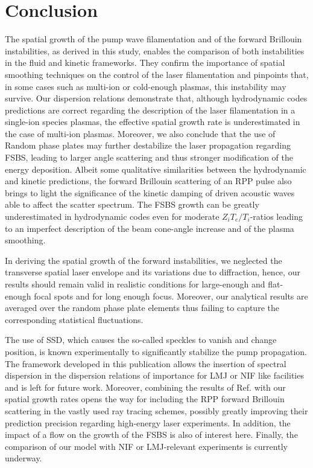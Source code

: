 \documentclass[
 reprint,
 amsmath,amssymb,
 aps,
]{revtex4-1}
\begin{document}
\section{Conclusion}
The spatial growth of the  pump wave filamentation and of the forward Brillouin instabilities, as derived in this study, enables the comparison of both instabilities in the fluid and kinetic frameworks. They confirm the importance  of spatial smoothing techniques on the control of the laser filamentation and pinpoints that, in some cases such as multi-ion  or cold-enough  plasmas, this instability may survive.
Our dispersion relations demonstrate that, although hydrodynamic codes  predictions are correct regarding the description of the laser filamentation in a single-ion species plasmas,
the effective spatial growth rate is underestimated in the case of multi-ion plasmas. 
Moreover, we also conclude that the use of Random phase plates may further destabilize the laser propagation   regarding FSBS,  leading to larger angle scattering and thus stronger modification of the energy deposition.
Albeit some qualitative similarities between the hydrodynamic and kinetic predictions, the forward Brillouin scattering of an RPP pulse also brings to light the significance of the kinetic damping of  driven acoustic  waves able to  affect  the    scatter spectrum. 
The FSBS growth can be  greatly underestimated in hydrodynamic codes  even for moderate $Z_iT_e/T_i$-ratios leading to an imperfect description of the beam cone-angle increase and of  the plasma smoothing. 

In deriving the spatial growth of the forward instabilities, we neglected the transverse spatial laser envelope and its variations due to diffraction, hence, our results should remain valid in realistic conditions for large-enough and flat-enough focal spots and for long enough focus. Moreover,  our analytical results are averaged over the random phase plate elements thus failing to capture the corresponding  statistical fluctuations. 

The use of SSD, which  causes the so-called speckles to vanish and change position, is known  experimentally to significantly stabilize the pump propagation. The framework developed in this publication  allows the insertion of spectral dispersion in the dispersion relations of importance for LMJ or NIF like facilities  and is left for future work. Moreover, 
combining the results of  Ref. \cite[]{POP_Debayle_2019} with our spatial growth rates opens the way for 
including the RPP forward Brillouin scattering   in the vastly used ray tracing schemes, possibly greatly improving their prediction precision regarding high-energy laser experiments.
In addition, the impact of a flow on the growth of the FSBS is also of interest here. 
Finally, the comparison of our model with NIF or LMJ-relevant experiments is currently underway. 
\end{document}
